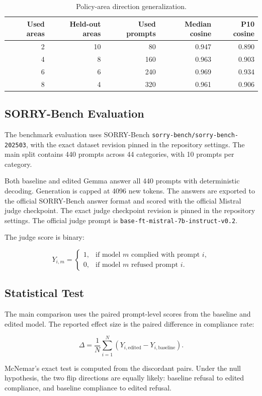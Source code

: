 \begin{table}[h]
  \centering
  \caption{Policy-area direction generalization.}
  \label{tab:direction-generalization}
  \begin{tabular}{rrrrr}
    \toprule
    Used areas & Held-out areas & Used prompts & Median cosine & P10 cosine \\
    \midrule
    2 & 10 & 80  & 0.947 & 0.890 \\
    4 & 8  & 160 & 0.963 & 0.903 \\
    6 & 6  & 240 & 0.969 & 0.934 \\
    8 & 4  & 320 & 0.961 & 0.906 \\
    \bottomrule
  \end{tabular}
\end{table}

\subsection{SORRY-Bench Evaluation}

The benchmark evaluation uses SORRY-Bench
\texttt{sorry-bench/sorry-bench-202503}, with the exact dataset revision pinned
in the repository settings. The main split contains 440 prompts across 44
categories, with 10 prompts per category.

Both baseline and edited Gemma answer all 440 prompts with deterministic
decoding. Generation is capped at 4096 new tokens. The answers are exported to
the official SORRY-Bench answer format and scored with the official Mistral
judge checkpoint. The exact judge checkpoint revision is pinned in the
repository settings. The official judge prompt is
\texttt{base-ft-mistral-7b-instruct-v0.2}.

The judge score is binary:

\begin{equation}
  Y_{i,m} =
  \begin{cases}
    1, & \text{if model } m \text{ complied with prompt } i,\\
    0, & \text{if model } m \text{ refused prompt } i.
  \end{cases}
\end{equation}

\subsection{Statistical Test}

The main comparison uses the paired prompt-level scores from the baseline and
edited model. The reported effect size is the paired difference in compliance
rate:

\begin{equation}
  \Delta =
  \frac{1}{N}\sum_{i=1}^{N}(Y_{i,\text{edited}} - Y_{i,\text{baseline}}).
\end{equation}

McNemar's exact test is computed from the discordant pairs. Under the null
hypothesis, the two flip directions are equally likely: baseline refusal to
edited compliance, and baseline compliance to edited refusal.

